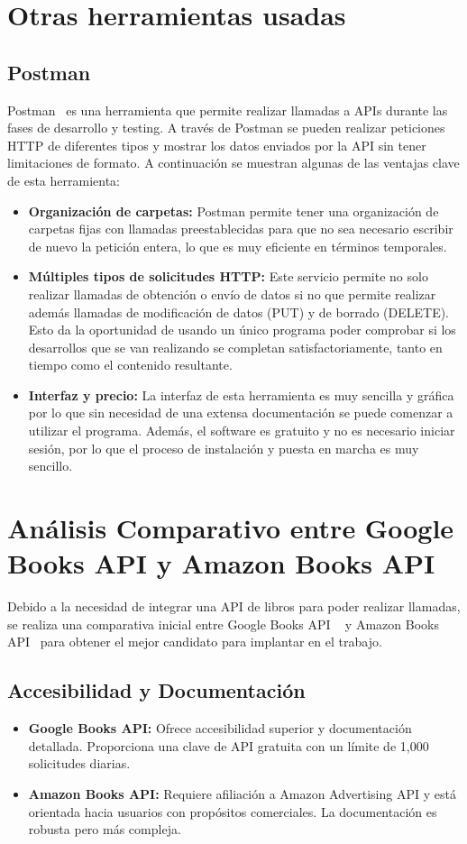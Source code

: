 \section{Otras herramientas usadas}

\subsection{Postman}
Postman~\cite{Postman} es una herramienta que permite realizar llamadas a APIs durante las fases de desarrollo y testing. A través de Postman se pueden realizar peticiones HTTP de diferentes tipos y mostrar los datos enviados por la API sin tener limitaciones de formato.
A continuación se muestran algunas de las ventajas clave de esta herramienta:
\begin{itemize}
    \item \textbf{Organización de carpetas:}
    Postman permite tener una organización de carpetas fijas con llamadas preestablecidas para que no sea necesario escribir de nuevo la petición entera, lo que es muy eficiente en términos temporales.
    \item \textbf{Múltiples tipos de solicitudes HTTP: } 
    Este servicio permite no solo realizar llamadas de obtención o envío de datos si no que permite realizar además llamadas de modificación de datos (PUT) y de borrado (DELETE). Esto da la oportunidad de usando un único programa poder comprobar si los desarrollos que se van realizando se completan satisfactoriamente, tanto en tiempo como el contenido resultante.
    \item \textbf{Interfaz y precio: }
    La interfaz de esta herramienta es muy sencilla y gráfica por lo que sin necesidad de una extensa documentación se puede comenzar a utilizar el programa. Además, el software es gratuito y no es necesario iniciar sesión, por lo que el proceso de instalación y puesta en marcha es muy sencillo.
\end{itemize}

\section{Análisis Comparativo entre Google Books API y Amazon Books API}
Debido a la necesidad de integrar una API de libros para poder realizar llamadas, se realiza una comparativa inicial entre Google Books API ~\cite{GoogleBooks} y Amazon Books API~\cite{AmazonBooks} para obtener el mejor candidato para implantar en el trabajo.
\subsection{Accesibilidad y Documentación}
\begin{itemize}
    \item \textbf{Google Books API:} Ofrece accesibilidad superior y documentación detallada. Proporciona una clave de API gratuita con un límite de 1,000 solicitudes diarias.
    \item \textbf{Amazon Books API:} Requiere afiliación a Amazon Advertising API y está orientada hacia usuarios con propósitos comerciales. La documentación es robusta pero más compleja.
\end{itemize}

